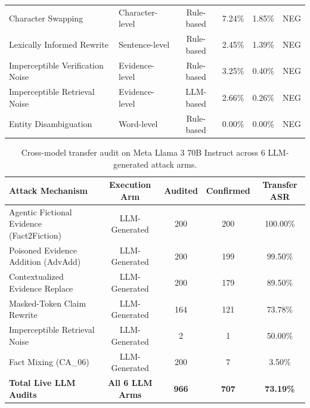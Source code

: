 \begin{table}[t]
\begin{tabular}{llcccc}
Character Swapping & Character-level & Rule-based & 7.24\% & 1.85\% & NEG \\
Lexically Informed Rewrite & Sentence-level & Rule-based & 2.45\% & 1.39\% & NEG \\
Imperceptible Verification Noise & Evidence-level & Rule-based & 3.25\% & 0.40\% & NEG \\
Imperceptible Retrieval Noise & Evidence-level & LLM-based & 2.66\% & 0.26\% & NEG \\
Entity Disambiguation & Word-level & Rule-based & 0.00\% & 0.00\% & NEG \\
\bottomrule
\end{tabular}
\end{table}

\begin{table}[t]
\centering
\small
\caption{Cross-model transfer audit on Meta Llama 3 70B Instruct across 6 LLM-generated attack arms.}
\label{tab:cross_model_transfer}
\begin{tabular}{lcccc}
\toprule
\textbf{Attack Mechanism} & \textbf{Execution Arm} & \textbf{Audited} & \textbf{Confirmed} & \textbf{Transfer ASR} \\
\midrule
Agentic Fictional Evidence (Fact2Fiction) & LLM-Generated & 200 & 200 & 100.00\% \\
Poisoned Evidence Addition (AdvAdd) & LLM-Generated & 200 & 199 & 99.50\% \\
Contextualized Evidence Replace & LLM-Generated & 200 & 179 & 89.50\% \\
Masked-Token Claim Rewrite & LLM-Generated & 164 & 121 & 73.78\% \\
Imperceptible Retrieval Noise & LLM-Generated & 2 & 1 & 50.00\% \\
Fact Mixing (CA\_06) & LLM-Generated & 200 & 7 & 3.50\% \\
\midrule
\textbf{Total Live LLM Audits} & \textbf{All 6 LLM Arms} & \textbf{966} & \textbf{707} & \textbf{73.19\%} \\
\bottomrule
\end{tabular}
\end{table}
